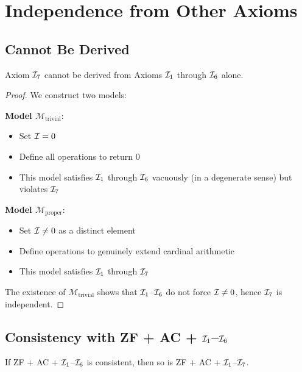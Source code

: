 \section{Independence from Other Axioms}

\subsection{Cannot Be Derived}

\begin{theorem}[Independence of $\I_7$]
\label{thm:I7-independence}
Axiom $\I_7$ cannot be derived from Axioms $\mathcal{I}_1$ through $\mathcal{I}_6$ alone.
\end{theorem}

\begin{proof}
We construct two models:

\textbf{Model $\mathcal{M}_{\text{trivial}}$}: 
\begin{itemize}
    \item Set $\mathcal{I} = 0$
    \item Define all operations to return $0$
    \item This model satisfies $\mathcal{I}_1$ through $\mathcal{I}_6$ vacuously (in a degenerate sense) but violates $\I_7$
\end{itemize}

\textbf{Model $\mathcal{M}_{\text{proper}}$}: 
\begin{itemize}
    \item Set $\mathcal{I} \neq 0$ as a distinct element
    \item Define operations to genuinely extend cardinal arithmetic
    \item This model satisfies $\mathcal{I}_1$ through $\I_7$
\end{itemize}

The existence of $\mathcal{M}_{\text{trivial}}$ shows that $\mathcal{I}_1$--$\mathcal{I}_6$ do not force $\mathcal{I} \neq 0$, hence $\I_7$ is independent.
\end{proof}

\subsection{Consistency with ZF + AC + $\mathcal{I}_1$--$\mathcal{I}_6$}

\begin{theorem}[Consistency of $\I_7$]
If ZF + AC + $\mathcal{I}_1$--$\mathcal{I}_6$ is consistent, then so is ZF + AC + $\mathcal{I}_1$--$\I_7$.
\end{theorem}

